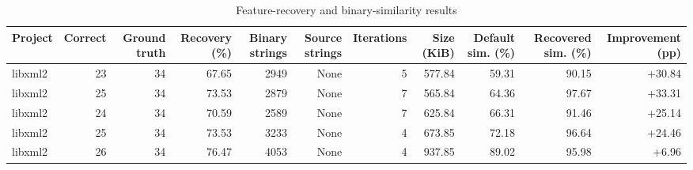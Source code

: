 \begin{table}[htbp]
\centering
\caption{Feature-recovery and binary-similarity results}
\label{tab:feature-recovery-results}
\small
\begin{tabular}{lrrrrrrrrrr}
\toprule
Project & Correct & Ground truth & Recovery (\%) & Binary strings & Source strings & Iterations & Size (KiB) & Default sim. (\%) & Recovered sim. (\%) & Improvement (pp) \\
\midrule
libxml2 & 23 & 34 & 67.65 & 2949 & None & 5 & 577.84 & 59.31 & 90.15 & +30.84 \\
libxml2 & 25 & 34 & 73.53 & 2879 & None & 7 & 565.84 & 64.36 & 97.67 & +33.31 \\
libxml2 & 24 & 34 & 70.59 & 2589 & None & 7 & 625.84 & 66.31 & 91.46 & +25.14 \\
libxml2 & 25 & 34 & 73.53 & 3233 & None & 4 & 673.85 & 72.18 & 96.64 & +24.46 \\
libxml2 & 26 & 34 & 76.47 & 4053 & None & 4 & 937.85 & 89.02 & 95.98 & +6.96 \\
\bottomrule
\end{tabular}
\end{table}
